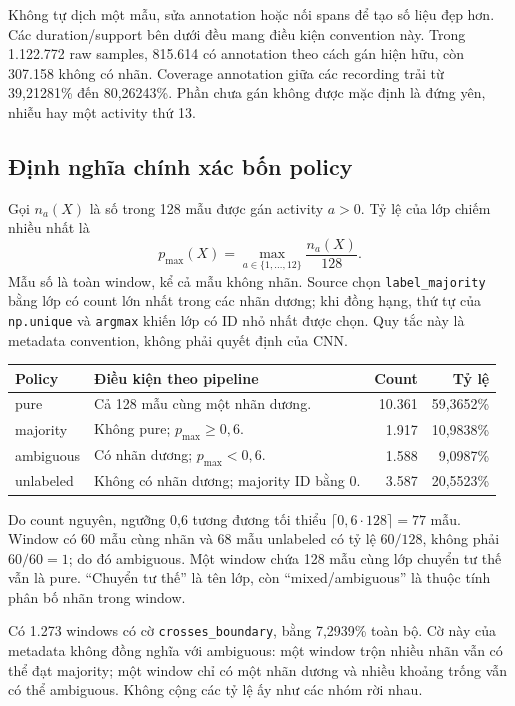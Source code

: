 \documentclass[11pt,a4paper]{article}
\newcommand{\code}[1]{{\small\ttfamily\nolinkurl{#1}}}
\theoremstyle{definition}
\begin{document}
Không tự dịch một mẫu, sửa annotation hoặc nối spans để tạo số liệu đẹp hơn.
Các duration/support bên dưới đều mang điều kiện convention này. Trong
1.122.772 raw samples, 815.614 có annotation theo cách gán hiện hữu, còn
307.158 không có nhãn. Coverage annotation giữa các recording trải từ
39,21281\% đến 80,26243\%. Phần chưa gán không được mặc định là đứng yên,
nhiễu hay một activity thứ 13.

\subsection{Định nghĩa chính xác bốn policy}
Gọi $n_a(X)$ là số trong 128 mẫu được gán activity $a>0$. Tỷ lệ của lớp
chiếm nhiều nhất là
\begin{equation}
p_{\max}(X)=\max_{a\in\{1,\ldots,12\}}\frac{n_a(X)}{128}.
\end{equation}
Mẫu số là toàn window, kể cả mẫu không nhãn. Source chọn
\code{label_majority} bằng lớp có count lớn nhất trong các nhãn dương;
khi đồng hạng, thứ tự của \code{np.unique} và \code{argmax} khiến lớp có ID
nhỏ nhất được chọn. Quy tắc này là metadata convention, không phải quyết
định của CNN.

\begin{tabularx}{\linewidth}{@{}P{2.2cm}Yrr@{}}\toprule
Policy & Điều kiện theo pipeline & Count & Tỷ lệ\\\midrule
pure & Cả 128 mẫu cùng một nhãn dương. & 10.361 & 59,3652\%\\
majority & Không pure; $p_{\max}\ge0,6$. & 1.917 & 10,9838\%\\
ambiguous & Có nhãn dương; $p_{\max}<0,6$. & 1.588 & 9,0987\%\\
unlabeled & Không có nhãn dương; majority ID bằng 0. & 3.587 & 20,5523\%\\\bottomrule
\end{tabularx}

Do count nguyên, ngưỡng 0,6 tương đương tối thiểu
$\lceil0,6\cdot128\rceil=77$ mẫu. Window có 60 mẫu cùng nhãn và 68 mẫu
unlabeled có tỷ lệ $60/128$, không phải $60/60=1$; do đó ambiguous. Một
window chứa 128 mẫu cùng lớp chuyển tư thế vẫn là pure. ``Chuyển tư thế''
là tên lớp, còn ``mixed/ambiguous'' là thuộc tính phân bố nhãn trong window.

Có 1.273 windows có cờ \code{crosses_boundary}, bằng 7,2939\% toàn bộ.
Cờ này của metadata không đồng nghĩa với ambiguous: một window trộn nhiều
nhãn vẫn có thể đạt majority; một window chỉ có một nhãn dương và nhiều
khoảng trống vẫn có thể ambiguous. Không cộng các tỷ lệ ấy như các nhóm rời nhau.
\end{document}
